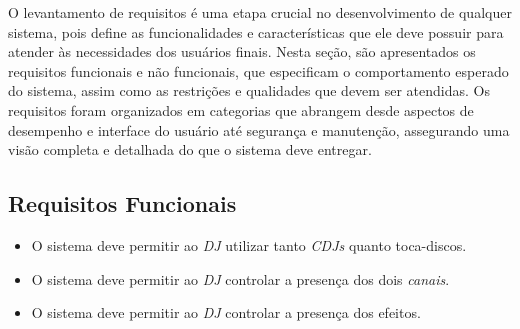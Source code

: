 O levantamento de requisitos é uma etapa crucial no desenvolvimento de qualquer sistema, pois define as funcionalidades e características que ele deve possuir para atender às necessidades dos usuários finais. Nesta seção, são apresentados os requisitos funcionais e não funcionais, que especificam o comportamento esperado do sistema, assim como as restrições e qualidades que devem ser atendidas. Os requisitos foram organizados em categorias que abrangem desde aspectos de desempenho e interface do usuário até segurança e manutenção, assegurando uma visão completa e detalhada do que o sistema deve entregar.

\subsection{Requisitos Funcionais}
\begin{itemize}
    \item O sistema deve permitir ao \textit{DJ} utilizar tanto \textit{CDJs} quanto toca-discos.
    \item O sistema deve permitir ao \textit{DJ} controlar a presença dos dois \textit{canais}.
    \item O sistema deve permitir ao \textit{DJ} controlar a presença dos efeitos.
\end{itemize}

